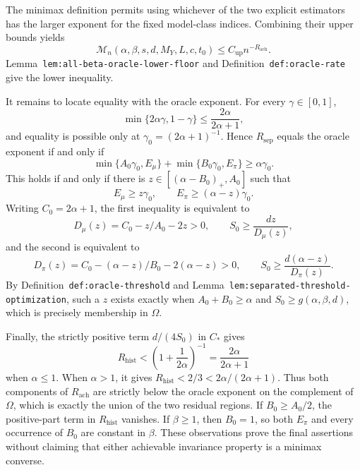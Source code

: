 The minimax definition permits using whichever of the two explicit estimators has the larger exponent for the fixed model-class indices. Combining their upper bounds yields
\[
\mathcal M_n(\alpha,\beta,s,d,M_Y,L,c,t_0)
\le C_{\mathrm{up}}n^{-R_{\mathrm{ach}}}.
\]
Lemma~\texttt{lem:all-beta-oracle-lower-floor} and Definition~\texttt{def:oracle-rate} give the lower inequality.

It remains to locate equality with the oracle exponent. For every \(\gamma\in[0,1]\),
\[
\min\{2\alpha\gamma,1-\gamma\}
\le\frac{2\alpha}{2\alpha+1},
\]
and equality is possible only at \(\gamma_0=(2\alpha+1)^{-1}\). Hence \(R_{\mathrm{sep}}\) equals the oracle exponent if and only if
\[
\min\{A_0\gamma_0,E_\mu\}
+
\min\{B_0\gamma_0,E_\pi\}
\ge\alpha\gamma_0.
\]
This holds if and only if there is \(z\in[(\alpha-B_0)_+,A_0]\) such that
\[
E_\mu\ge z\gamma_0,
\qquad E_\pi\ge(\alpha-z)\gamma_0.
\]
Writing \(C_0=2\alpha+1\), the first inequality is equivalent to
\[
D_\mu(z)=C_0-z/A_0-2z>0,
\qquad
S_0\ge\frac{dz}{D_\mu(z)},
\]
and the second is equivalent to
\[
D_\pi(z)=C_0-(\alpha-z)/B_0-2(\alpha-z)>0,
\qquad
S_0\ge\frac{d(\alpha-z)}{D_\pi(z)}.
\]
By Definition~\texttt{def:oracle-threshold} and Lemma~\texttt{lem:separated-threshold-optimization}, such a \(z\) exists exactly when \(A_0+B_0\ge\alpha\) and \(S_0\ge g(\alpha,\beta,d)\), which is precisely membership in \(\Omega\).

Finally, the strictly positive term \(d/(4S_0)\) in \(C_*\) gives
\[
R_{\mathrm{hist}}<\left(1+\frac1{2\alpha}\right)^{-1}
=
\frac{2\alpha}{2\alpha+1}
\]
when \(\alpha\le1\). When \(\alpha>1\), it gives \(R_{\mathrm{hist}}<2/3<2\alpha/(2\alpha+1)\). Thus both components of \(R_{\mathrm{ach}}\) are strictly below the oracle exponent on the complement of \(\Omega\), which is exactly the union of the two residual regions. If \(B_0\ge A_0/2\), the positive-part term in \(R_{\mathrm{hist}}\) vanishes. If \(\beta\ge1\), then \(B_0=1\), so both \(E_\pi\) and every occurrence of \(B_0\) are constant in \(\beta\). These observations prove the final assertions without claiming that either achievable invariance property is a minimax converse.